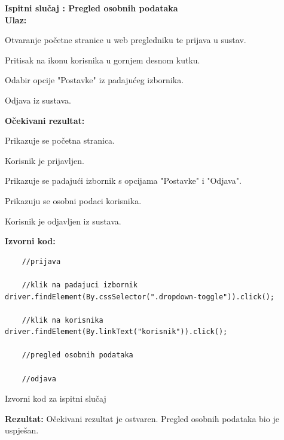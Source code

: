 			\noindent \textbf{Ispitni slučaj \thetestcase: Pregled osobnih podataka} \\
			\noindent \textbf{Ulaz:}
			\begin{packed_enum}
				\item Otvaranje početne stranice u web pregledniku te prijava u sustav\footnotemark.
				\item Pritisak na ikonu korisnika u gornjem desnom kutku.
				\item Odabir opcije "Postavke" iz padajućeg izbornika.
				\item Odjava iz sustava\footnotemark[\value{footnote}].

			\end{packed_enum}
			\noindent \textbf{Očekivani rezultat:}
			\begin{packed_enum}
				\item[1.a] Prikazuje se početna stranica.
				\item[1.b] Korisnik je prijavljen.
				\item[2.\ \ ] Prikazuje se padajući izbornik s opcijama "Postavke" i "Odjava".
				\item[3.\ \ ] Prikazuju se osobni podaci korisnika.
				\item[4.\ \ ] Korisnik je odjavljen iz sustava.
			\end{packed_enum}
			\noindent \textbf{Izvorni kod:}

			\begin{listing}[H]
\begin{lstlisting}
    //prijava
    
    //klik na padajuci izbornik
driver.findElement(By.cssSelector(".dropdown-toggle")).click();
    
    //klik na korisnika
driver.findElement(By.linkText("korisnik")).click();

    //pregled osobnih podataka

    //odjava
\end{lstlisting}
				\caption{Izvorni kod za ispitni slučaj \thetestcase}
				\label{test3}
			\end{listing}
			\noindent \textbf{Rezultat:} Očekivani rezultat je ostvaren. Pregled osobnih podataka bio je uspješan. 
			
